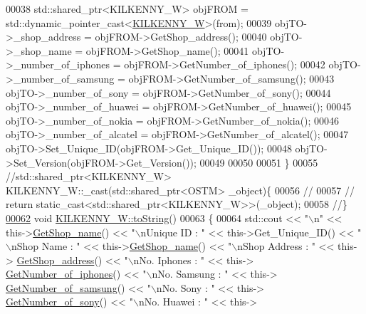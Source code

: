 \begin{DoxyCode}
00038     std::shared\_ptr<KILKENNY\_W> objFROM = std::dynamic\_pointer\_cast<\hyperlink{class_k_i_l_k_e_n_n_y___w}{KILKENNY\_W}>(from);
00039     objTO->\_shop\_address = objFROM->GetShop\_address();
00040     objTO->\_shop\_name = objFROM->GetShop\_name();
00041     objTO->\_number\_of\_iphones = objFROM->GetNumber\_of\_iphones();
00042     objTO->\_number\_of\_samsung = objFROM->GetNumber\_of\_samsung();
00043     objTO->\_number\_of\_sony = objFROM->GetNumber\_of\_sony();
00044     objTO->\_number\_of\_huawei = objFROM->GetNumber\_of\_huawei();
00045     objTO->\_number\_of\_nokia = objFROM->GetNumber\_of\_nokia();
00046     objTO->\_number\_of\_alcatel = objFROM->GetNumber\_of\_alcatel();
00047     objTO->Set\_Unique\_ID(objFROM->Get\_Unique\_ID());
00048     objTO->Set\_Version(objFROM->Get\_Version());
00049     
00050    
00051 \}
00055 \textcolor{comment}{//std::shared\_ptr<KILKENNY\_W> KILKENNY\_W::\_cast(std::shared\_ptr<OSTM> \_object)\{}
00056 \textcolor{comment}{//    }
00057 \textcolor{comment}{//    return static\_cast<std::shared\_ptr<KILKENNY\_W>>(\_object);}
00058 \textcolor{comment}{//\}}
\hypertarget{_k_i_l_k_e_n_n_y___w_8cpp_source.tex_l00062}{}\hyperlink{class_k_i_l_k_e_n_n_y___w_aea627b4c0efd0f725363556afe1ad849}{00062} \textcolor{comment}{}\textcolor{keywordtype}{void} \hyperlink{class_k_i_l_k_e_n_n_y___w_aea627b4c0efd0f725363556afe1ad849}{KILKENNY\_W::toString}()
00063 \{
00064    std::cout << \textcolor{stringliteral}{"\(\backslash\)n"} <<  this->\hyperlink{class_k_i_l_k_e_n_n_y___w_a93dac05f03edc97797f89501aa2af73a}{GetShop\_name}() << \textcolor{stringliteral}{"\(\backslash\)nUnique ID : "} << this->Get\_Unique\_ID() << \textcolor{stringliteral}{"
      \(\backslash\)nShop Name : "}  << this->\hyperlink{class_k_i_l_k_e_n_n_y___w_a93dac05f03edc97797f89501aa2af73a}{GetShop\_name}() << \textcolor{stringliteral}{"\(\backslash\)nShop Address : "} << this->
      \hyperlink{class_k_i_l_k_e_n_n_y___w_ad35a9d60fff2a3c1088f93ff04e6d9d4}{GetShop\_address}() << \textcolor{stringliteral}{"\(\backslash\)nNo. Iphones : "} << this->
      \hyperlink{class_k_i_l_k_e_n_n_y___w_aa8eb9ca20372744a05ab64def268a940}{GetNumber\_of\_iphones}() << \textcolor{stringliteral}{"\(\backslash\)nNo. Samsung : "} << this->
      \hyperlink{class_k_i_l_k_e_n_n_y___w_ac73e56bbdb3915546b8774f260edc30e}{GetNumber\_of\_samsung}() << \textcolor{stringliteral}{"\(\backslash\)nNo. Sony : "} << this->
      \hyperlink{class_k_i_l_k_e_n_n_y___w_a804254083a84b05b320e5723c0568e6f}{GetNumber\_of\_sony}() << \textcolor{stringliteral}{"\(\backslash\)nNo. Huawei : "} << this->

\end{DoxyCode}
